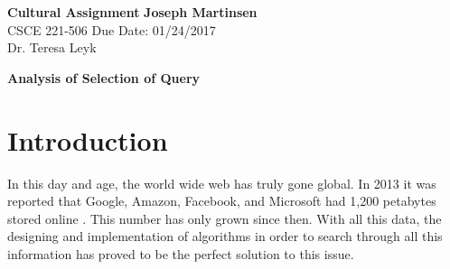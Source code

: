 \documentclass[letter, 11pt]{article}
\begin{document}
\noindent
\large\textbf{Cultural Assignment} \hfill \textbf{Joseph Martinsen} \\
\normalsize CSCE 221-506 \hfill Due Date: 01/24/2017 \\
Dr. Teresa Leyk \\

\centerline{\textbf{\huge Analysis of Selection of Query}}


\section*{Introduction}
\vspace{-10pt}
\begin{doublespace}
In this day and age, the world wide web has truly gone global. In 2013 it was reported that Google, Amazon, Facebook, and Microsoft had 1,200 petabytes stored online \cite{sciencefocus}. This number has only grown since then. With all this data, the designing and implementation of algorithms in order to search through all this information has proved to be the perfect solution to this issue.
\end{doublespace}

\vspace{-10pt}
\end{document}
